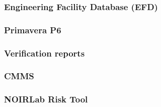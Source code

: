 \subsubsection{Engineering Facility Database (EFD)}



\subsubsection{Primavera P6}



\subsubsection{Verification reports}



\subsubsection{CMMS}



\subsubsection{NOIRLab Risk Tool}



